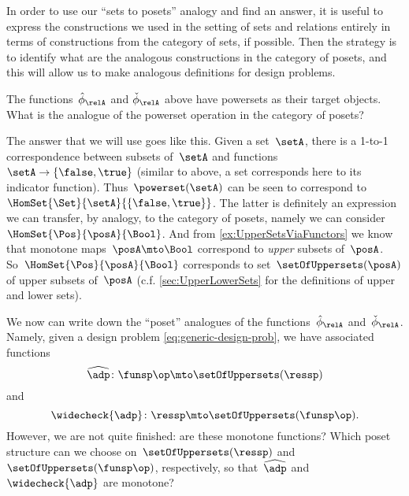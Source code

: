 In order to use our ``sets to posets'' analogy and find an answer, it is useful to express the constructions we used in the setting of sets and relations entirely in terms of constructions from the category of sets, if possible.
Then the strategy is to identify what are the analogous constructions in the category of posets, and this will allow us to make analogous definitions for design problems.

The functions~$\hat \phi_{\relA}$ and $\check \phi_{\relA}$ above have powersets as their target objects. What is the analogue of the powerset operation in the category of posets?

The answer that we will use goes like this.
Given a set~$\setA$, there is a 1-to-1 correspondence between subsets of~$\setA$ and functions~$\setA \to \{ \false, \true \}$ (similar to above, a set corresponds here to its indicator function).
Thus~$\powerset (\setA)$ can be seen to correspond to~$\HomSet{\Set}{\setA}{\{ \false, \true\}}$.
The latter is definitely an expression we can transfer, by analogy, to the category of posets, namely we can consider~$\HomSet{\Pos}{\posA}{\Bool}$.
And from \cref{ex:UpperSetsViaFunctors} we know that monotone maps~$\posA \mto \Bool$ correspond to \emph{upper} subsets of~$\posA$.
So~$\HomSet{\Pos}{\posA}{\Bool}$ corresponds to set~$\setOfUppersets (\posA)$ of upper subsets of~$\posA$ (c.f. \cref{sec:UpperLowerSets} for the definitions of upper and lower sets).

We now can write down the ``poset'' analogues of the functions~$\hat \phi_{\relA}$ and~$\check \phi_{\relA}$.
Namely, given a design problem \cref{eq:generic-design-prob}, we have associated functions
\begin{equation}
    \label{eq:dp-left-curry}
    \widehat{\adp} \colon \funsp\op \mto \setOfUppersets (\ressp)
\end{equation}
and
\begin{equation}
    \label{eq:dp-right-curry}
    \widecheck{\adp} \colon \ressp \mto \setOfUppersets (\funsp\op).
\end{equation}
However, we are not quite finished: are these monotone functions? Which poset structure can we choose on~$\setOfUppersets (\ressp)$ and~$\setOfUppersets (\funsp\op)$,
respectively, so that~$\widehat{\adp}$ and~$\widecheck{\adp}$ are monotone?

